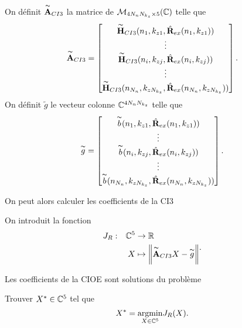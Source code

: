     \begin{defn}
      On définit \(\overset{\thicksim}{\mathbf{A}}_{CI3}\) la matrice de \(\mathcal{M}_{4N_{n}N_{k_z}\times5}(\mathbb C)\) telle que
      \begin{equation*}
        \overset{\thicksim}{\mathbf{A}}_{CI3} = 
        \begin{bmatrix}
          \overset{\thicksim}{\mathbf{H}}_{CI3}(n_1,k_{z1},\hat{\mathbf{R}}_{ex}(n_1,k_{z1}))
          \\
          \vdots
          \\
          \overset{\thicksim}{\mathbf{H}}_{CI3}(n_i,k_{zj},\hat{\mathbf{R}}_{ex}(n_i,k_{zj}))
          \\
          \vdots
          \\
          \overset{\thicksim}{\mathbf{H}}_{CI3}(n_{N_n},k_{zN_{k_z}},\hat{\mathbf{R}}_{ex}(n_{N_n},k_{zN_{k_z}}))
        \end{bmatrix}.
      \end{equation*}
      On définit \(\tilde{g}\) le vecteur colonne \(\mathbb C^{4N_{n}N_{k_z}}\) telle que
      \begin{equation*}
        \overset{\thicksim}{g} = 
        \begin{bmatrix}
          \overset{\thicksim}{b}(n_1,k_{z1},\hat{\mathbf{R}}_{ex}(n_1,k_{z1}))
          \\
          \vdots
          \\
          \overset{\thicksim}{b}(n_i,k_{zj},\hat{\mathbf{R}}_{ex}(n_i,k_{zj}))
          \\
          \vdots
          \\
          \overset{\thicksim}{b}(n_{N_n},k_{zN_{k_z}},\hat{\mathbf{R}}_{ex}(n_{N_n},k_{zN_{k_z}}))
        \end{bmatrix}.
      \end{equation*}
    \end{defn}

    On peut alors calculer les coefficients de la CI3

    \begin{defn}
      On introduit la fonction
      \begin{equation*}
        \begin{aligned} &J_R: & \mathbb C^5 &\rightarrow \mathbb R \\ & & X & \mapsto \left\lVert\overset{\thicksim}{\mathbf{A}}_{CI3}X - \overset{\thicksim}{g}\right\rVert \end{aligned}.
      \end{equation*}
    \end{defn}

    \begin{defn}

      Les coefficients de la CIOE sont solutions du problème

      Trouver \(X^* \in \mathbb C^5\) tel que
      \begin{equation*}
        X^* = {\underset{X\in \mathbb C^5}{\operatorname{argmin}}} J_R(X).
      \end{equation*}
    \end{defn}

